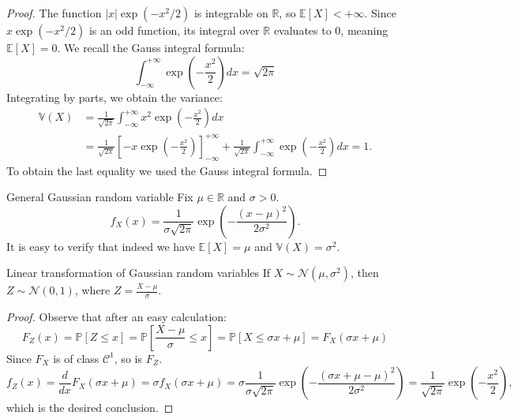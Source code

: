 \documentclass[11pt, a4paper]{article}
\begin{document}
\begin{proof} %
The function $|x|\exp(-x^2/2)$ is integrable on $\mathbb{R}$, so $\mathbb{E}[X] < +\infty$. %
Since $x \exp(-x^2/2)$ is an odd function, its integral over $\mathbb{R}$ evaluates to $0$, meaning $\mathbb{E}[X] = 0$. %
We recall the Gauss integral formula: %
\[ \int_{-\infty}^{+\infty} \exp\left(-\frac{x^2}{2}\right) dx = \sqrt{2\pi} \] %
Integrating by parts, we obtain the variance: %
\begin{align*}
    \mathbb{V}(X) &= \frac{1}{\sqrt{2\pi}} \int_{-\infty}^{+\infty} x^2 \exp\left(-\frac{x^2}{2}\right) dx \\
    &= \frac{1}{\sqrt{2\pi}} \left[ -x \exp\left(-\frac{x^2}{2}\right) \right]_{-\infty}^{+\infty} + \frac{1}{\sqrt{2\pi}} \int_{-\infty}^{+\infty} \exp\left(-\frac{x^2}{2}\right) dx = 1.
\end{align*} %
To obtain the last equality we used the Gauss integral formula. %
\end{proof}

\begin{definition}{General Gaussian random variable}{} %
Fix $\mu \in \mathbb{R}$ and $\sigma > 0$. %
\[ f_X(x) = \frac{1}{\sigma\sqrt{2\pi}} \exp\left(-\frac{(x-\mu)^2}{2\sigma^2}\right). \] %
It is easy to verify that indeed we have $\mathbb{E}[X] = \mu$ and $\mathbb{V}(X) = \sigma^2$. %
\end{definition}

\begin{proposition}{Linear transformation of Gaussian random variables}{} %
If $X \sim \mathcal{N}(\mu, \sigma^2)$, then $Z \sim \mathcal{N}(0,1)$, where $Z = \frac{X - \mu}{\sigma}$. %
\end{proposition}

\begin{proof} %
Observe that after an easy calculation: %
\[ F_Z(x) = \mathbb{P}[Z \le x] = \mathbb{P}\left[\frac{X - \mu}{\sigma} \le x\right] = \mathbb{P}[X \le \sigma x + \mu] = F_X(\sigma x + \mu) \] %
Since $F_X$ is of class $\mathcal{C}^1$, so is $F_Z$. %
\[ f_Z(x) = \frac{d}{dx} F_X(\sigma x + \mu) = \sigma f_X(\sigma x + \mu) = \sigma \frac{1}{\sigma\sqrt{2\pi}} \exp\left(-\frac{(\sigma x + \mu - \mu)^2}{2\sigma^2}\right) = \frac{1}{\sqrt{2\pi}} \exp\left(-\frac{x^2}{2}\right), \] %
which is the desired conclusion. %
\end{proof}
\end{document}
